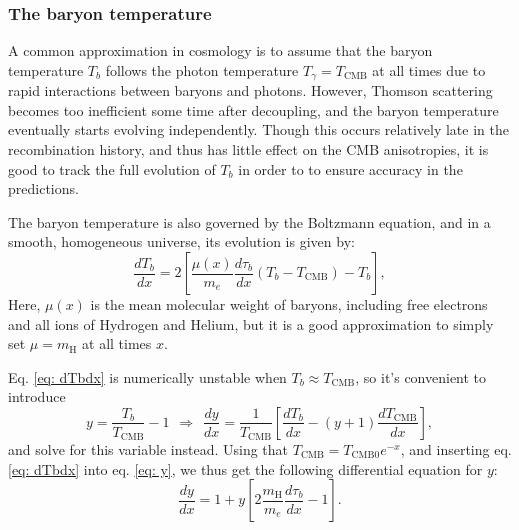 \documentclass{aa}
\numberwithin{equation}{section}
\numberwithin{table}{section}
\numberwithin{figure}{section}
\begin{document}






\subsubsection{The baryon temperature}\label{subsubsec: II theory baryon temp}
A common approximation in cosmology is to assume that the baryon temperature $T_b$ follows the photon temperature $T_\gamma=T_\text{CMB}$ at all times due to rapid interactions between baryons and photons. However, Thomson scattering becomes too inefficient some time after decoupling, and the baryon temperature eventually starts evolving independently. Though this occurs relatively late in the recombination history, and thus has little effect on the CMB anisotropies, it is good to track the full evolution of $T_b$ in order to to ensure accuracy in the predictions. 

The baryon temperature is also governed by the Boltzmann equation, and in a smooth, homogeneous universe, its evolution is given by:
\begin{equation}
\frac{dT_b}{dx} = 2\left[\frac{\mu(x)}{m_e}\frac{d\tau_b}{dx}(T_b -T_\text{CMB}) - T_b \right], \label{eq: dTbdx}
\end{equation}
Here, $\mu(x)$ is the mean molecular weight of baryons, including free electrons and all ions of Hydrogen and Helium, but it is a good approximation to simply set $\mu = m_\text{H}$ at all times $x$. 

Eq. \eqref{eq: dTbdx} is numerically unstable when $T_b\approx T_\text{CMB}$, so it's convenient to introduce
\begin{equation}
  y = \frac{T_b}{T_\text{CMB}} - 1 \hspace{5pt}\Rightarrow\hspace{5pt} \frac{dy}{dx} = \frac{1}{T_\text{CMB}}\left[\frac{dT_b}{dx} - (y+1)\frac{dT_\text{CMB}}{dx} \right], \label{eq: y}
\end{equation}
and solve for this variable instead. Using that $T_\text{CMB}=T_\text{CMB0}e^{-x}$, and inserting eq. \eqref{eq: dTbdx} into eq. \eqref{eq: y}, we thus get the following differential equation for $y$:
\begin{equation}
  \frac{dy}{dx} = 1 + y\left[2\frac{m_\text{H}}{m_e}\frac{d\tau_b}{dx} -  1\right].
\end{equation}
\end{document}
